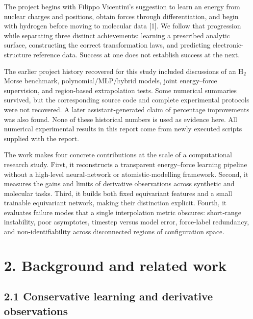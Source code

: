 \documentclass[
  11pt,
  a4paper,
]{article}
\begin{document}
The project begins with Filippo Vicentini's suggestion to learn an
energy from nuclear charges and positions, obtain forces through
differentiation, and begin with hydrogen before moving to molecular data
{[}1{]}. We follow that progression while separating three distinct
achievements: learning a prescribed analytic surface, constructing the
correct transformation laws, and predicting electronic-structure
reference data. Success at one does not establish success at the next.

The earlier project history recovered for this study included
discussions of an H\(_2\) Morse benchmark, polynomial/MLP/hybrid models,
joint energy--force supervision, and region-based extrapolation tests.
Some numerical summaries survived, but the corresponding source code and
complete experimental protocols were not recovered. A later
assistant-generated claim of percentage improvements was also found.
None of these historical numbers is used as evidence here. All numerical
experimental results in this report come from newly executed scripts
supplied with the report.

The work makes four concrete contributions at the scale of a
computational research study. First, it reconstructs a transparent
energy--force learning pipeline without a high-level neural-network or
atomistic-modelling framework. Second, it measures the gains and limits
of derivative observations across synthetic and molecular tasks. Third,
it builds both fixed equivariant features and a small trainable
equivariant network, making their distinction explicit. Fourth, it
evaluates failure modes that a single interpolation metric obscures:
short-range instability, poor asymptotes, timestep versus model error,
force-label redundancy, and non-identifiability across disconnected
regions of configuration space.

\hypertarget{background-and-related-work}{%
\section{2. Background and related
work}\label{background-and-related-work}}

\hypertarget{conservative-learning-and-derivative-observations}{%
\subsection{2.1 Conservative learning and derivative
observations}\label{conservative-learning-and-derivative-observations}}
\end{document}
